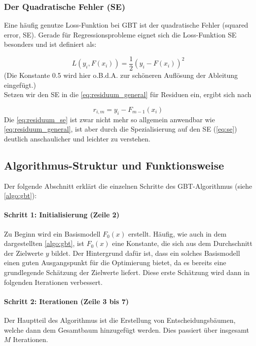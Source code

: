 \subsubsection{Der Quadratische Fehler (SE)}
Eine häufig genutze Loss-Funktion bei GBT ist der quadratische Fehler (squared error, SE). Gerade für Regressionsprobleme eignet sich die Loss-Funktion SE besonders und ist  definiert als:

\begin{equation}
    L(y_i, F(x_i)) = \frac{1}{2}(y_i - F(x_i))^2 \label{eq:se}
\end{equation}
(Die Konstante 0.5 wird hier o.B.d.A. zur schöneren Auflösung der Ableitung eingefügt.) \\
Setzen wir den SE in die \autoref{eq:residuum_general} für Residuen ein, ergibt sich nach \textcite[S.~346]{Frochte2020}

\begin{equation}
    \label{eq:residuum_se}
    r_{i,m} = y_i-F_{m-1}(x_i)
\end{equation}
Die \autoref{eq:residuum_se} ist zwar nicht mehr so allgemein anwendbar wie \autoref{eq:residuum_general}, ist aber durch die Spezialisierung auf den SE (\autoref{eq:se}) deutlich anschaulicher und leichter zu verstehen.

\subsection{Algorithmus-Struktur und Funktionsweise}
Der folgende Abschnitt erklärt die einzelnen Schritte des GBT-Algorithmus (siehe \autoref{algo:gbt}):

\paragraph{Schritt 1: Initialisierung (Zeile 2)}\label{para:GBT_Initialisierung}
Zu Beginn wird ein Basismodell \( F_0(x) \) erstellt. Häufig, wie auch in dem dargestellten \autoref{algo:gbt}, ist \( F_0(x) \) eine Konstante, die sich aus dem Durchschnitt der Zielwerte \( y\) bildet. Der Hintergrund dafür ist, dass ein solches Basismodell einen guten Ausgangspunkt für die Optimierung bietet, da es bereits eine grundlegende Schätzung der Zielwerte liefert. Diese erste Schätzung wird dann in  folgenden Iterationen verbessert.

\paragraph{Schritt 2: Iterationen (Zeile 3 bis 7)}
Der Hauptteil des Algorithmus ist die Erstellung von Entscheidungsbäumen, welche dann dem Gesamtbaum hinzugefügt werden. Dies passiert über insgesamt \( M \) Iterationen.

